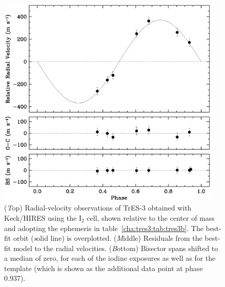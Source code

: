 \begin{figure}
\begin{center}
\includegraphics[width=0.95\textwidth]{5_f1}
\caption[%
Radial-velocity observations of TrES-3]{%
({\textit Top}) Radial-velocity observations of TrES-3 obtained with Keck/HIRES using the
$\mathrm{I}_2$ cell, shown relative to the center of mass and adopting the ephemeris in table~\ref{cha:tres3:tab:tres3b}.
The best-fit orbit ({\textit solid line}) is overplotted.
({\textit Middle}) Residuals from the best-fit model to the radial velocities.
({\textit Bottom}) Bisector spans shifted to a median of zero, for each of the iodine exposures as well as for the template (which is shown as the additional data point at phase 0.937).%
}\label{cha:tres3:fig:rvtres3}
\end{center}
\end{figure}


